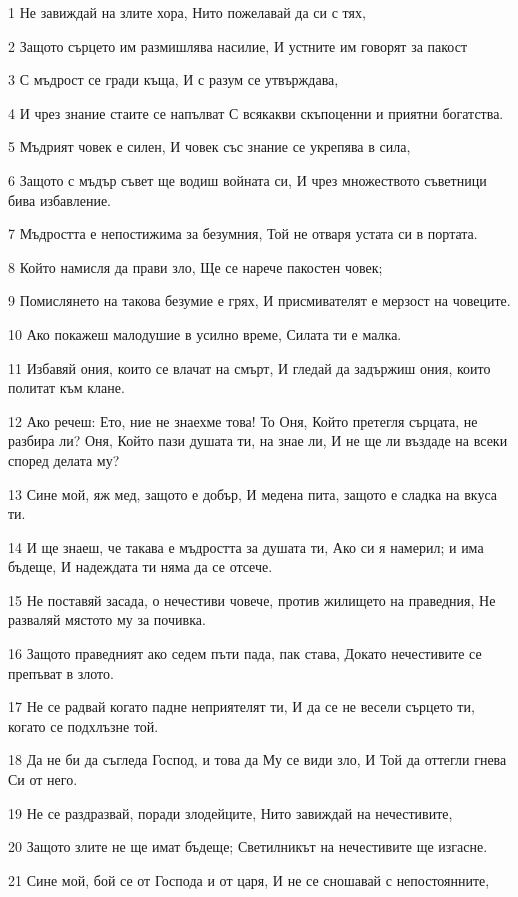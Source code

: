 \par 1 Не завиждай на злите хора, Нито пожелавай да си с тях,
\par 2 Защото сърцето им размишлява насилие, И устните им говорят за пакост
\par 3 С мъдрост се гради къща, И с разум се утвърждава,
\par 4 И чрез знание стаите се напълват С всякакви скъпоценни и приятни богатства.
\par 5 Мъдрият човек е силен, И човек със знание се укрепява в сила,
\par 6 Защото с мъдър съвет ще водиш войната си, И чрез множеството съветници бива избавление.
\par 7 Мъдростта е непостижима за безумния, Той не отваря устата си в портата.
\par 8 Който намисля да прави зло, Ще се нарече пакостен човек;
\par 9 Помислянето на такова безумие е грях, И присмивателят е мерзост на човеците.
\par 10 Ако покажеш малодушие в усилно време, Силата ти е малка.
\par 11 Избавяй ония, които се влачат на смърт, И гледай да задържиш ония, които политат към клане.
\par 12 Ако речеш: Ето, ние не знаехме това! То Оня, Който претегля сърцата, не разбира ли? Оня, Който пази душата ти, на знае ли, И не ще ли въздаде на всеки според делата му?
\par 13 Сине мой, яж мед, защото е добър, И медена пита, защото е сладка на вкуса ти.
\par 14 И ще знаеш, че такава е мъдростта за душата ти, Ако си я намерил; и има бъдеще, И надеждата ти няма да се отсече.
\par 15 Не поставяй засада, о нечестиви човече, против жилището на праведния, Не разваляй мястото му за почивка.
\par 16 Защото праведният ако седем пъти пада, пак става, Докато нечестивите се препъват в злото.
\par 17 Не се радвай когато падне неприятелят ти, И да се не весели сърцето ти, когато се подхлъзне той.
\par 18 Да не би да съгледа Господ, и това да Му се види зло, И Той да оттегли гнева Си от него.
\par 19 Не се раздразвай, поради злодейците, Нито завиждай на нечестивите,
\par 20 Защото злите не ще имат бъдеще; Светилникът на нечестивите ще изгасне.
\par 21 Сине мой, бой се от Господа и от царя, И не се сношавай с непостоянните,
